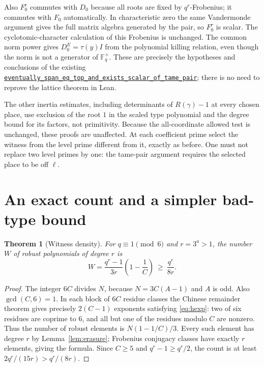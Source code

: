 \documentclass[11pt]{article}
\newtheorem{theorem}{Theorem}[section]
\theoremstyle{definition}\newtheorem{definition}[theorem]{Definition}
\newcommand{\F}{\mathbb F}\newcommand{\ord}{\operatorname{ord}}\newcommand{\Nrm}{\operatorname{N}}\newcommand{\vpp}{v_p}
\newcommand{\src}[2]{\href{https://github.com/VladimirReshetnikov/ProveIt/blob/ee10f937fedac0955d28b7b860f4c44fab508204/Analysis/GeneralizedRiemannHypothesis/Lean/grh/src/#1}{\texttt{#2}}}
\begin{document}
Also $F_0^r$ commutes with $D_0$ because all roots are fixed by $q^r$-Frobenius; it commutes with $F_0$ automatically. In characteristic zero the same Vandermonde argument gives the full matrix algebra generated by the pair, so $F_0^r$ is scalar. The cyclotomic-character calculation of this Frobenius is unchanged. The common norm power gives $D_0^E=\tau(y)I$ from the polynomial killing relation, even though the norm is not a generator of $\F_q^\times$. These are precisely the hypotheses and conclusions of the existing \src{New/Congruences/GaloisRepresentations/RowsAndColumnsFromLabels.lean\#L510}{eventually\_span\_eq\_top\_and\_exists\_scalar\_of\_tame\_pair}; there is no need to reprove the lattice theorem in Lean.

The other inertia estimates, including determinants of $R(\gamma)-1$ at every chosen place, use exclusion of the root $1$ in the scaled type polynomial and the degree bound for its factors, not primitivity. Because the all-coordinate allowed test is unchanged, these proofs are unaffected. At each coefficient prime select the witness from the level prime different from it, exactly as before. One must not replace two level primes by one: the tame-pair argument requires the selected place to be off $\ell$.

\section{An exact count and a simpler bad-type bound}
\begin{theorem}[Witness density]\label{thm:count}
For $q\equiv1\pmod6$ and $r=3^a>1$, the number $W$ of robust polynomials of degree $r$ is
\[
                  W=\frac{q^r-1}{3r}\left(1-\frac1C\right)
                  \ \ge\ \frac{q^r}{8r}.
\]
\end{theorem}
\begin{proof}
The integer $6C$ divides $N$, because $N=3C(A-1)$ and $A$ is odd. Also $\gcd(C,6)=1$. In each block of $6C$ residue classes the Chinese remainder theorem gives precisely $2(C-1)$ exponents satisfying \eqref{eq:hexp}: two of six residues are coprime to $6$, and all but one of the residues modulo $C$ are nonzero. Thus the number of robust elements is $N(1-1/C)/3$. Every such element has degree $r$ by Lemma~\ref{lem:erasure}; Frobenius conjugacy classes have exactly $r$ elements, giving the formula. Since $C\ge5$ and $q^r-1\ge q^r/2$, the count is at least $2q^r/(15r)>q^r/(8r)$.
\end{proof}
\end{document}
